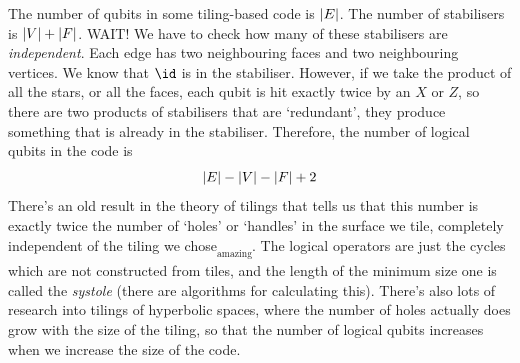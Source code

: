 \documentclass[10pt,a4paper, english]{scrartcl}
\begin{document}
The number of qubits in some tiling-based code is $\left \vert E \right \vert$.
The number of stabilisers is $\left \vert V \right \vert + \left \vert F \right \vert$. 
WAIT! 
We have to check how many of these stabilisers are \emph{independent}. 
Each edge has two neighbouring faces and two neighbouring vertices. 
We know that $\id$ is in the stabiliser. 
However, if we take the product of all the stars, or all the faces, each qubit is hit exactly twice by an $X$ or $Z$, so there are two products of stabilisers that are `redundant', they produce something that is already in the stabiliser. 
Therefore, the number of logical qubits in the code is 
\begin{equation}
\left \vert E \right \vert - \left \vert V \right \vert - \left \vert F \right \vert + 2 
\end{equation}
There's an old result in the theory of tilings that tells us that this number is exactly twice the number of `holes' or `handles' in the surface we tile, completely independent of the tiling we chose\textsubscript{\textsubscript{amazing}}.
The logical operators are just the cycles which are not constructed from tiles, and the length of the minimum size one is called the \emph{systole} (there are algorithms for calculating this). 
There's also lots of research into tilings of hyperbolic spaces, where the number of holes actually does grow with the size of the tiling, so that the number of logical qubits increases when we increase the size of the code. 
\end{document}
